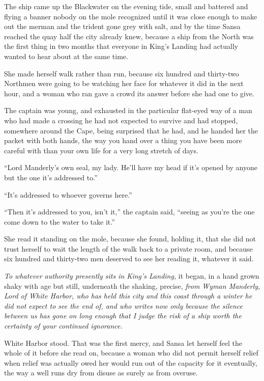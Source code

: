 The ship came up the Blackwater on the evening tide, small and battered and flying a banner nobody on the mole recognized until it was close enough to make out the merman and the trident gone grey with salt, and by the time Sansa reached the quay half the city already knew, because a ship from the North was the first thing in two months that everyone in King’s Landing had actually wanted to hear about at the same time.

She made herself walk rather than run, because six hundred and thirty-two Northmen were going to be watching her face for whatever it did in the next hour, and a woman who ran gave a crowd its answer before she had one to give.

\sceneBreak

The captain was young, and exhausted in the particular flat-eyed way of a man who had made a crossing he had not expected to survive and had stopped, somewhere around the Cape, being surprised that he had, and he handed her the packet with both hands, the way you hand over a thing you have been more careful with than your own life for a very long stretch of days.

“Lord Manderly’s own seal, my lady. He’ll have my head if it’s opened by anyone but the one it’s addressed to.”

“It’s addressed to whoever governs here.”

“Then it’s addressed to you, isn’t it,” the captain said, “seeing as you’re the one come down to the water to take it.”

She read it standing on the mole, because she found, holding it, that she did not trust herself to wait the length of the walk back to a private room, and because six hundred and thirty-two men deserved to see her reading it, whatever it said.

\sceneBreak

\textit{To whatever authority presently sits in King’s Landing,} it began, in a hand grown shaky with age but still, underneath the shaking, precise, \textit{from Wyman Manderly, Lord of White Harbor, who has held this city and this coast through a winter he did not expect to see the end of, and who writes now only because the silence between us has gone on long enough that I judge the risk of a ship worth the certainty of your continued ignorance.}

White Harbor stood. That was the first mercy, and Sansa let herself feel the whole of it before she read on, because a woman who did not permit herself relief when relief was actually owed her would run out of the capacity for it eventually, the way a well runs dry from disuse as surely as from overuse.

